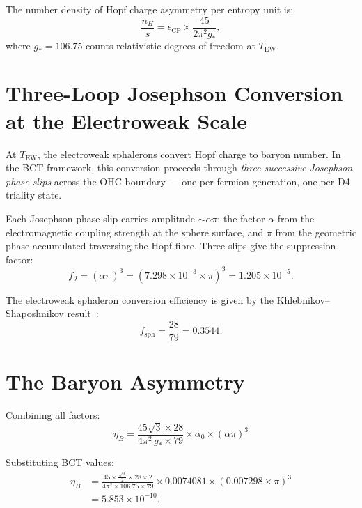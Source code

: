 \documentclass[aps,prl,twocolumn,superscriptaddress,showpacs]{revtex4-2}
\begin{document}
The number density of Hopf charge asymmetry per entropy unit is:
\begin{equation}
\frac{n_H}{s} = \epsilon_\mathrm{CP} \times \frac{45}{2\pi^2 g_*},
\end{equation}
where $g_* = 106.75$ counts relativistic degrees of freedom at $T_\mathrm{EW}$.

\section{Three-Loop Josephson Conversion at the Electroweak Scale}

At $T_\mathrm{EW}$, the electroweak sphalerons convert Hopf charge to 
baryon number. In the BCT framework, this conversion proceeds through 
\emph{three successive Josephson phase slips} across the OHC boundary 
--- one per fermion generation, one per D4 triality state.

Each Josephson phase slip carries amplitude $\sim \alpha\pi$: the factor 
$\alpha$ from the electromagnetic coupling strength at the sphere surface, 
and $\pi$ from the geometric phase accumulated traversing the Hopf fibre.  
Three slips give the suppression factor:
\begin{equation}
f_J = (\alpha\pi)^3 = (7.298\times 10^{-3} \times \pi)^3 = 1.205\times 10^{-5}.
\end{equation}

The electroweak sphaleron conversion efficiency is given by the 
Khlebnikov--Shaposhnikov result~\cite{KhlebShap1988}:
\begin{equation}
f_\mathrm{sph} = \frac{28}{79} = 0.3544.
\end{equation}

\section{The Baryon Asymmetry}

Combining all factors:
\begin{equation}
\boxed{
\eta_B = \frac{45\sqrt{3}\times 28}{4\pi^2\, g_*\times 79}
\times \alpha_0 \times (\alpha\pi)^3
}
\end{equation}

Substituting BCT values:
\begin{align}
\eta_B &= \frac{45\times\frac{\sqrt{3}}{2}\times 28 \times 2}
{4\pi^2 \times 106.75 \times 79}
\times 0.0074081 \times (0.007298\times\pi)^3 \nonumber\\
&= 5.853\times 10^{-10}.
\end{align}
\end{document}
